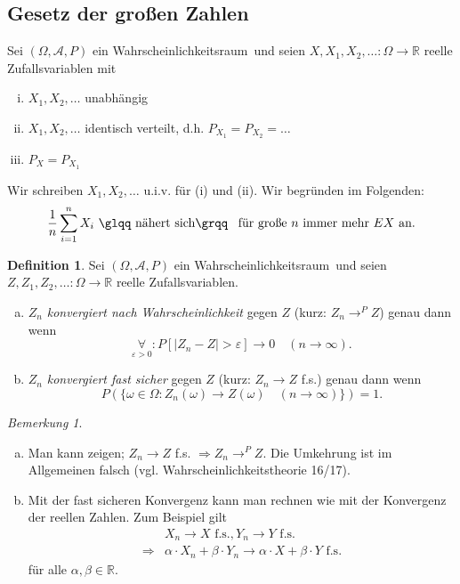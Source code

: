 \documentclass[a4paper,12pt,fleqn]{scrartcl}
\newcommand{\R}{\mathbb{R}}
\newcommand{\m}[1]{\mathcal{ #1 }}
\newcommand{\WR}{Wahrscheinlichkeitsraum}
\newcommand{\ZV}{Zufallsvariable}
\newcommand{\impl}{\Rightarrow}
\newcommand{\fa}[1]{\mathop{\forall}\limits_{#1}}
\theoremstyle{definition}
\newtheorem{definition}{Definition}[section]
\theoremstyle{plain}
\theoremstyle{remark}
\newtheorem*{bemerkung}{Bemerkung}
\begin{document}
\subsection{Gesetz der großen Zahlen}
Sei $(\Omega, \m{A}, P)$ ein \WR \, und seien $X, X_1, X_2, \ldots : \Omega \rightarrow \R$ reelle \ZV n mit
\begin{enumerate}[(i)]
\item $X_1, X_2, \ldots$ unabhängig
\item $X_1, X_2, \ldots$ identisch verteilt, d.h. $ P_{X_1} = P_{X_2} = \ldots$
\item $P_X = P_{X_1}$
\end{enumerate}
Wir schreiben $X_1, X_2, \ldots$ u.i.v. für (i) und (ii). Wir begründen im Folgenden:
\[\frac{1}{n} \sum_{i=1}^n X_i \text{ \glqq nähert sich\grqq \, für große } n \text{ immer mehr } EX \text{ an.}\]
\begin{definition}
Sei $(\Omega, \m{A}, P)$ ein \WR \, und seien $Z, Z_1, Z_2, \ldots : \Omega \rightarrow \R$ reelle \ZV n.
\begin{enumerate}[a)]
\item $Z_n$ \emph{konvergiert nach Wahrscheinlichkeit} gegen $Z$ (kurz: $Z_n \rightarrow^P Z$) genau dann wenn
\[\fa{\varepsilon > 0}: P[|Z_n - Z| > \varepsilon] \rightarrow 0 \quad (n \rightarrow \infty).\]
\item $Z_n$ \emph{konvergiert fast sicher} gegen $Z$ (kurz: $Z_n \rightarrow Z$ f.s.) genau dann wenn
\[P(\{\omega \in \Omega : Z_n(\omega) \rightarrow Z(\omega) \quad (n \rightarrow \infty)\}) = 1.\]
\end{enumerate}
\end{definition}
\begin{bemerkung}
\begin{enumerate}[a)]
\item Man kann zeigen; $Z_n \rightarrow Z$ f.s. $\impl Z_n \rightarrow^P Z$. Die Umkehrung ist im Allgemeinen falsch (vgl. Wahrscheinlichkeitstheorie 16/17).
\item Mit der fast sicheren Konvergenz kann man rechnen wie mit der Konvergenz der reellen Zahlen. Zum Beispiel gilt
\begin{align*}
&X_n \rightarrow X \text{ f.s.} , Y_n \rightarrow Y \text{ f.s. } \\
\impl& \alpha \cdot X_n + \beta \cdot Y_n \rightarrow \alpha \cdot X + \beta \cdot Y \text{ f.s.} 
\end{align*}
für alle $\alpha, \beta \in \R$.
\end{enumerate}
\end{bemerkung}
\end{document}
